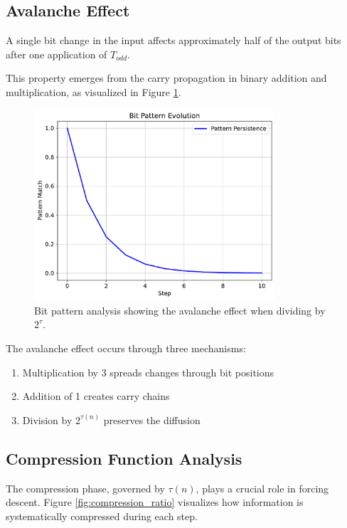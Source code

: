 \subsection{Avalanche Effect}

\begin{theorem}\label{thm:avalanche}
A single bit change in the input affects approximately half of the output bits after one application of $T_{odd}$.
\end{theorem}

This property emerges from the carry propagation in binary addition and multiplication, as visualized in Figure \ref{fig:bit_patterns}.

\begin{figure}[h]
\centering
\includegraphics[width=0.8\textwidth]{figures/bit_patterns.pdf}
\caption{Bit pattern analysis showing the avalanche effect when dividing by $2^\tau$.}
\label{fig:bit_patterns}
\end{figure}

The avalanche effect occurs through three mechanisms:
\begin{enumerate}
\item Multiplication by 3 spreads changes through bit positions
\item Addition of 1 creates carry chains
\item Division by $2^{\tau(n)}$ preserves the diffusion
\end{enumerate}

\subsection{Compression Function Analysis}

The compression phase, governed by $\tau(n)$, plays a crucial role in forcing descent. Figure \ref{fig:compression_ratio} visualizes how information is systematically compressed during each step.

